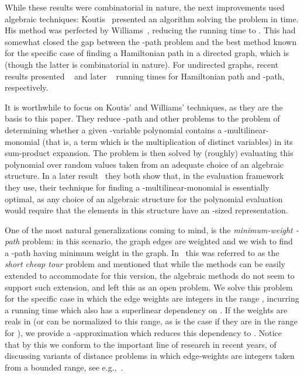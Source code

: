 \documentclass{llncs}
\begin{document}
While these results were combinatorial in nature, the next improvements used algebraic techniques: Koutis~\cite{Koutis08} presented an algorithm solving the problem in  time. His method was perfected by Williams~\cite{Williams09}, reducing the running time to . This had somewhat closed the gap between the -path problem and the best method known for the specific case of finding a Hamiltonian path in a directed graph, which is  (though the latter is combinatorial in nature). For undirected graphs, recent results presented ~\cite{Bjorklund10} and later ~\cite{BHKK10,AB13}
running times for Hamiltonian path and -path, respectively.

It is worthwhile to focus on Koutis' and Williams' techniques, as they are the basis to this paper. They reduce -path and other problems to the problem of determining whether a given -variable polynomial contains a -multilinear-monomial (that is, a term which is the multiplication of  distinct variables) in its sum-product expansion. The problem is then solved by (roughly) evaluating this polynomial over random values taken from an adequate choice of an algebraic structure. 
In a later result~\cite{KW09} they both show that, in the evaluation framework they use, their technique for finding a -multilinear-monomial is essentially optimal, as any choice of an algebraic structure for the polynomial evaluation would require that the elements in this structure have an -sized representation. 

One of the most natural generalizations coming to mind, is the \emph{minimum-weight -path} problem: in this scenario, the graph edges are weighted and we wish to find a -path having minimum weight in the graph. In~\cite{Williams09} this was referred to as the \emph{short cheap tour} problem and mentioned that while the  methods can be easily extended to accommodate for this version, the algebraic methods do not seem to support such extension, and left this as an open problem. We solve this problem for the specific case in which the edge weights are integers in the range , incurring a running time which also has a superlinear dependency on . If the weights are reals in  (or can be normalized to this range, as is the case if they are in the range  for ), we provide a -approximation which reduces this dependency to . Notice that by this we conform to the important line of research in recent years, of discussing variants of distance problems in which edge-weights are integers taken from a bounded range, see e.g.,~\cite{Zwick02,CGS12}.
\end{document}
